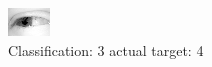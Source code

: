 \begin{figure}[h!]
\begin{center}
\includegraphics[width=0.60\columnwidth]{figures/ID2511_class_3_target_4.png}
\end{center}
\caption{ Classification: 3 actual target: 4}
\label{fig:ID2511_class_3_target_4}
\end{figure}
